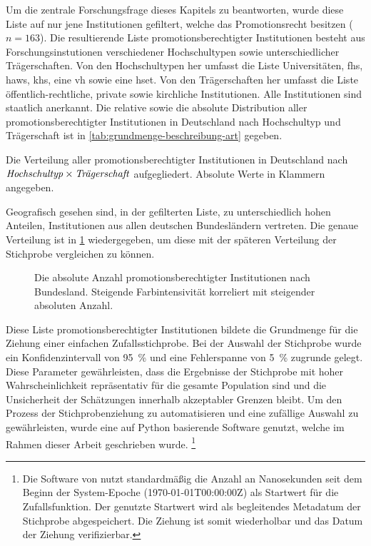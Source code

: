 Um die zentrale Forschungsfrage dieses Kapitels zu beantworten, wurde diese Liste auf nur jene Institutionen gefiltert, welche das Promotionsrecht besitzen ($n=163$).
Die resultierende Liste promotionsberechtigter Institutionen besteht aus Forschungsinstutionen verschiedener Hochschultypen sowie unterschiedlicher Trägerschaften.
Von den Hochschultypen her umfasst die Liste Universitäten, \glspl{fh}, \glspl{haw}, \glspl{kh}, eine \gls{vh} sowie eine \gls{hset}.
Von den Trägerschaften her umfasst die Liste öffentlich-rechtliche, private sowie kirchliche Institutionen. Alle Institutionen sind staatlich anerkannt.
Die relative sowie die absolute Distribution aller promotionsberechtigter Institutionen in Deutschland nach Hochschultyp und Trägerschaft ist in \cref{tab:grundmenge-beschreibung-art} gegeben.
\begin{table}[!htbp]
	\caption{Die Verteilung aller promotionsberechtigter Institutionen in Deutschland nach $\text{\textit{Hochschultyp}}\times\text{\textit{Trägerschaft}}$ aufgegliedert. Absolute Werte in Klammern angegeben.}
    
	\label{tab:grundmenge-beschreibung-art}
\end{table}

\noindent Geografisch gesehen sind, in der gefilterten Liste, zu unterschiedlich hohen Anteilen, Institutionen aus allen deutschen Bundesländern vertreten.
Die genaue Verteilung ist in \cref{fig:DE-grundmenge-beschreibung} wiedergegeben, um diese mit der späteren Verteilung der Stichprobe vergleichen zu können.
\begin{figure}[!htbp]
    \centering
    
    \caption{Die absolute Anzahl promotionsberechtigter Institutionen nach Bundesland.
    Steigende Farbintensivität korreliert mit steigender absoluten Anzahl.}
    \label{fig:DE-grundmenge-beschreibung}
\end{figure}


Diese Liste promotionsberechtigter Institutionen bildete die Grundmenge für die Ziehung einer einfachen Zufallsstichprobe.
Bei der Auswahl der Stichprobe wurde ein Konfidenzintervall von \SI{95}{\percent} und eine Fehlerspanne von \SI{5}{\percent} zugrunde gelegt.
Diese Parameter gewährleisten, dass die Ergebnisse der Stichprobe mit hoher Wahrscheinlichkeit repräsentativ für die gesamte Population sind und die Unsicherheit der Schätzungen innerhalb akzeptabler Grenzen bleibt.
Um den Prozess der Stichprobenziehung zu automatisieren und eine zufällige Auswahl zu gewährleisten, wurde eine auf Python basierende Software \autocite{Krassnig2024-csv} genutzt, welche im Rahmen dieser Arbeit geschrieben wurde.%
\footnote{%
Die Software von \citeauthor{Krassnig2024-csv} \autocite{Krassnig2024-csv} nutzt standardmäßig die Anzahl an Nanosekunden seit dem Beginn der System-Epoche (1970-01-01T00:00:00Z) als Startwert für die Zufallsfunktion.
Der genutzte Startwert wird als begleitendes Metadatum der Stichprobe abgespeichert.
Die Ziehung ist somit wiederholbar und das Datum der Ziehung verifizierbar.} 

